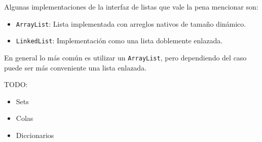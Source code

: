     Algunas implementaciones de la interfaz de listas que vale la pena mencionar son:
    \begin{itemize}
      \item \texttt{ArrayList}: Lista implementada con arreglos nativos de tamaño dinámico.
      \item \texttt{LinkedList}: Implementación como una lista doblemente enlazada.
    \end{itemize}

    En general lo más común es utilizar un \texttt{ArrayList}, pero dependiendo del caso puede ser
    más conveniente una lista enlazada.\autocite{so-linked-vs-array}

  TODO:
  \begin{itemize}
    \item Sets
    \item Colas
    \item Diccionarios
  \end{itemize}
